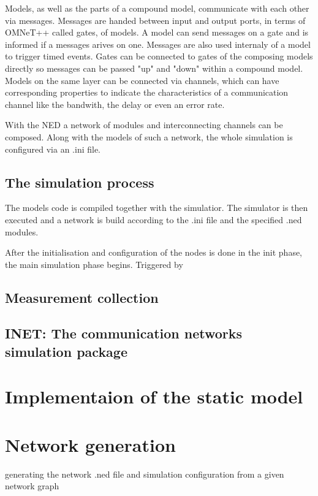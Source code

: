 Models, as well as the parts of a compound model, communicate with each other via messages. Messages are handed between input and output ports, in terms of OMNeT++ called gates, of models. A model can send messages on a gate and is informed if a messages arives on one. Messages are also used internaly of a model to trigger timed events. Gates can be connected to gates of the composing models directly so messages can be passed "up" and "down" within a compound model. Models on the same layer can be connected via channels, which can have corresponding properties to indicate the characteristics of a communication channel like the bandwith, the delay or even an error rate.

With the NED a network of modules and interconnecting channels can be composed. Along with the models of such a network, the whole simulation is configured via an .ini file.

\subsection{The simulation process}

The models code is compiled together with the simulatior. The simulator is then executed and a network is build according to the .ini file and the specified .ned modules.

After the initialisation and configuration of the nodes is done in the init phase, the main simulation phase begins. Triggered by 

\subsection{Measurement collection}

\subsection{INET: The communication networks simulation package}


\section{Implementaion of the static model}


\section{Network generation}

generating the network .ned file and simulation configuration from a given network graph

